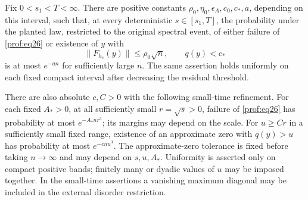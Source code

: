 \begin{proposition}\label{prof:positive-stability}
Fix $0<s_1<T<\infty$.  There are positive constants
$\rho_0,\eta_0,\epsilon_A,c_0,c_*,a$, depending on this interval,
such that, at every deterministic $s\in[s_1,T]$, the probability under
the planted law, restricted to the original spectral event, of either
failure of \eqref{prof:eq26} or existence of $y$ with
\[
 \|F_{h_s}(y)\|\le\rho_0\sqrt n,\qquad q(y)<c_*
\]
is at most $e^{-an}$ for sufficiently large $n$.  The same assertion
holds uniformly on each fixed compact interval after decreasing the
residual threshold.

There are also absolute $c,C>0$ with the following small-time
refinement.  For each fixed $A_*>0$, at all sufficiently small
$r=\sqrt s>0$, failure of \eqref{prof:eq26} has probability at most
$e^{-A_*nr^3}$; its margins may depend on the scale.  For
$u\ge Cr$ in a sufficiently small fixed range, existence of an
approximate zero with $q(y)>u$ has probability at most $e^{-cnu^3}$.
The approximate-zero tolerance is fixed before taking $n\to\infty$
and may depend on $s,u,A_*$.  Uniformity is asserted only on compact
positive bands; finitely many or dyadic values of $u$ may be imposed
together.  In the small-time assertions a vanishing maximum diagonal
may be included in the external disorder restriction.
\end{proposition}

